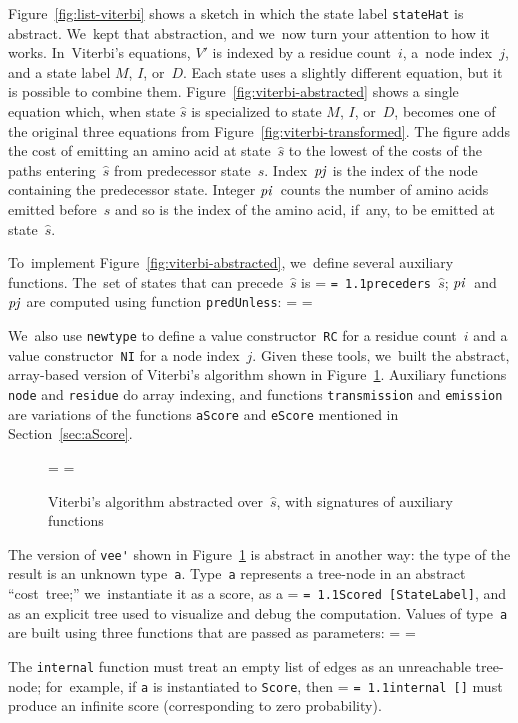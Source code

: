 \documentclass[]{jfp1}
\makeatletter
\newcommand\figref[1]{Figure~\ref{fig:#1}}
\newcommand\figlabel[1]{\label{fig:#1}}
\newcommand\secref[1]{Section~\ref{sec:#1}}
\newif\ifverbatimsmall
\newcommand{\mono}[1]{%
  {\@tempdima = \fontdimen2\font
   \texttt{\spaceskip = 1.1\@tempdima #1}}}
\newcommand\smallverbatiminput[1]{%
  \verbatimsmalltrue
  \presvtopsep=\topsep
  \topsep=0.78\topsep
  \verbatimsmallfalse
  \topsep=\presvtopsep
}
\makeatother
\begin{document}
\figref{list-viterbi} shows a sketch in which the state
label \texttt{stateHat} is abstract.
We~kept that abstraction, and
we~now turn your attention to how it works.
In~Viterbi's equations,
$V'$ is indexed by a residue count~$i$,
a~node index~$j$,
and
a state label $M$, $I$, or~$D$.
Each state uses a slightly different equation, but it is possible to
combine them.
\figref{viterbi-abstracted} shows a single equation which, when
state $\hat s$ is specialized to state $M$, $I$, or~$D$, becomes one of the
original three equations from \figref{viterbi-transformed}.
The figure adds the cost of emitting an amino acid at state~$\hat s$
to the lowest of the costs of the paths entering~$\hat s$ from predecessor
state~$s$.
Index~$\mathit{pj}$ is the index of the node containing the predecessor
state.
Integer $\mathit{pi}$~counts the number of amino acids emitted before~$\hat
s$ and so is the index of the amino acid, if~any, to be
emitted at state~$\hat s$.

To~implement \figref{viterbi-abstracted}, we~define several
auxiliary functions.
The~set of states that can precede~$\hat s$
is \mono{preceders~$\hat s$}; $\mathit{pi}$~and~$\mathit{pj}$ are computed using
function \texttt{predUnless}:
\smallverbatiminput{v4aux}
We~also use \texttt{newtype} to define 
a value constructor~\texttt{RC} for a residue count~$i$
and
a value constructor~\texttt{NI} for a node index~$j$.
Given these tools, we~built the abstract, array-based version of
Viterbi's algorithm 
shown in \figref{viterbi-hov4}.
Auxiliary functions \texttt{node} and \texttt{residue} do array
indexing, and functions \texttt{transmission} and \texttt{emission}
are variations of the functions \texttt{aScore} and \texttt{eScore}
mentioned in \secref{aScore}.


\begin{figure}
\noindent\hspace*{1.0cm}\begin{minipage}{11cm}
\smallverbatiminput{hov4}
\smallskip
\end{minipage}

\caption{Viterbi's algorithm abstracted over~$\hat s$, with signatures
of auxiliary functions}
\figlabel{viterbi-hov4}
\end{figure}


The version of \verb+vee'+ shown in  \figref{viterbi-hov4} is abstract
in another way: the type of the result is an unknown type~\texttt{a}.
Type~\texttt{a} represents a tree-node in an abstract ``cost~tree;''
we~instantiate it as a score, as a \mono{Scored~[StateLabel]},
and as an explicit tree used to visualize and debug the computation.
Values of type~\texttt{a} are built using three functions that are
passed as parameters:
\smallverbatiminput{hosigs}
The \texttt{internal} function must treat an empty list of edges as an
unreachable tree-node; for~example, if \texttt{a} is instantiated
to \texttt{Score}, then \mono{internal~[]} must produce an infinite
score (corresponding to zero probability).
\end{document}
